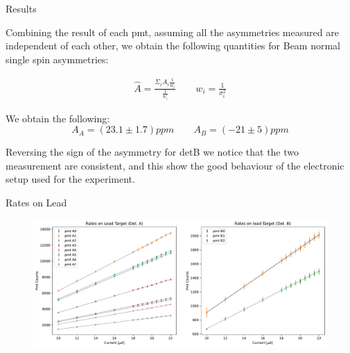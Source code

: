 \documentclass[9pt,a4paper]{beamer}
\begin{document}
\begin{frame}{Results}
 
Combining the result of each pmt, assuming all the asymmetries measured are independent of each other, we obtain the following quantities for Beam normal single spin asymmetries:

\begin{gather*}
\hat{A} =  \frac{\Sigma_{i} A_{i} \frac{1}{w_{i}}}{\frac{1}{w_{i}}} \qquad w_{i} = \frac{1}{\sigma^{2}_{i}}
\end{gather*}

We obtain the following:
\begin{equation}
A_{A} = (23.1 \pm 1.7) ppm  \qquad A_{B} = (-21  \pm 5)ppm
\end{equation}

Reversing the sign of the asymmetry for detB we notice that the two measurement are consistent, and this show the good behaviour of the electronic setup used for the experiment. 

\end{frame}

\begin{frame}{Rates on Lead}
\begin{figure}[hbtp]
\centering
\includegraphics[width = \textwidth]{figures/LeadRates.pdf}
\end{figure}

\end{frame}
\end{document}
